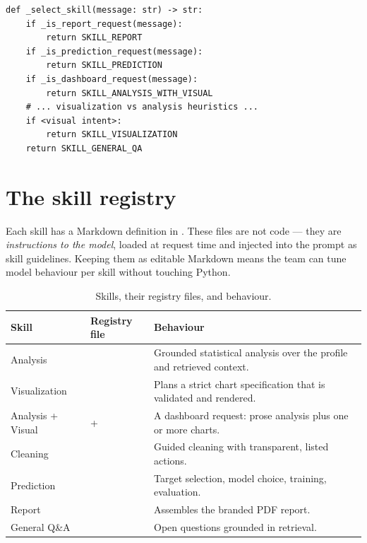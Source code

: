 \begin{lstlisting}[style=py,caption={The heuristic skill selector (\code{\_select\_skill}).}]
def _select_skill(message: str) -> str:
    if _is_report_request(message):
        return SKILL_REPORT
    if _is_prediction_request(message):
        return SKILL_PREDICTION
    if _is_dashboard_request(message):
        return SKILL_ANALYSIS_WITH_VISUAL
    # ... visualization vs analysis heuristics ...
    if <visual intent>:
        return SKILL_VISUALIZATION
    return SKILL_GENERAL_QA
\end{lstlisting}

\section{The skill registry}
Each skill has a Markdown definition in . These files
are not code --- they are \emph{instructions to the model}, loaded at request
time and injected into the prompt as skill guidelines. Keeping them as editable
Markdown means the team can tune model behaviour per skill without touching
Python.

\begin{table}[h]
\centering
\caption{Skills, their registry files, and behaviour.}
\small
\begin{tabularx}{\linewidth}{@{}L{2.5cm} L{2.6cm} X@{}}
\toprule
\textbf{Skill} & \textbf{Registry file} & \textbf{Behaviour} \\
\midrule
Analysis &  & Grounded statistical analysis over the profile
and retrieved context. \\
Visualization &  & Plans a strict chart specification
that is validated and rendered. \\
Analysis + Visual &  +  & A dashboard
request: prose analysis plus one or more charts. \\
Cleaning &  & Guided cleaning with transparent, listed
actions. \\
Prediction &  & Target selection, model choice, training,
evaluation. \\
Report &  & Assembles the branded PDF report. \\
General Q\&A &  & Open questions grounded in retrieval. \\
\bottomrule
\end{tabularx}
\end{table}

